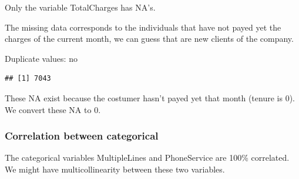 \documentclass[
  twoside]{article}
\newenvironment{Shaded}{\begin{snugshade}}{\end{snugshade}}
\newcommand{\DecValTok}[1]{\textcolor[rgb]{0.00,0.00,0.81}{#1}}
\newcommand{\FunctionTok}[1]{\textcolor[rgb]{0.00,0.00,0.00}{#1}}
\newcommand{\NormalTok}[1]{#1}
\newcommand{\OtherTok}[1]{\textcolor[rgb]{0.56,0.35,0.01}{#1}}
\newcommand{\SpecialCharTok}[1]{\textcolor[rgb]{0.00,0.00,0.00}{#1}}
\newcommand{\StringTok}[1]{\textcolor[rgb]{0.31,0.60,0.02}{#1}}
\begin{document}
Only the variable TotalCharges has NA's.

The missing data corresponds to the individuals that have not payed yet
the charges of the current month, we can guess that are new clients of
the company.

Duplicate values: no

\begin{Shaded}
\end{Shaded}

\begin{verbatim}
## [1] 7043
\end{verbatim}

These NA exist because the costumer hasn't payed yet that month (tenure
is 0). We convert these NA to 0.

\begin{Shaded}
\end{Shaded}

\hypertarget{correlation-between-categorical}{%
\subsubsection{Correlation between
categorical}\label{correlation-between-categorical}}

The categorical variables MultipleLines and PhoneService are 100\%
correlated. We might have multicollinearity between these two variables.

\begin{Shaded}
\end{Shaded}
\end{document}
